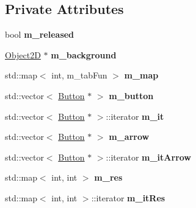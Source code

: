 \subsection*{Private Attributes}
\begin{DoxyCompactItemize}
\item 
\hypertarget{class_option_state_a297c72dde7082d4674447e9ba4ef3902}{}bool {\bfseries m\+\_\+released}\label{class_option_state_a297c72dde7082d4674447e9ba4ef3902}

\item 
\hypertarget{class_option_state_a405e39bcf1789208f5325585135b0558}{}\hyperlink{class_object2_d}{Object2\+D} $\ast$ {\bfseries m\+\_\+background}\label{class_option_state_a405e39bcf1789208f5325585135b0558}

\item 
\hypertarget{class_option_state_ac50d70dca5a11eea55010a229b9dc0e0}{}std\+::map$<$ int, m\+\_\+tab\+Fun $>$ {\bfseries m\+\_\+map}\label{class_option_state_ac50d70dca5a11eea55010a229b9dc0e0}

\item 
\hypertarget{class_option_state_ae8cbbd5a41b2501ce5e937498e188579}{}std\+::vector$<$ \hyperlink{class_button}{Button} $\ast$ $>$ {\bfseries m\+\_\+button}\label{class_option_state_ae8cbbd5a41b2501ce5e937498e188579}

\item 
\hypertarget{class_option_state_a4a92d30e579f3fbdcfde1d1f2a184c38}{}std\+::vector$<$ \hyperlink{class_button}{Button} $\ast$ $>$\+::iterator {\bfseries m\+\_\+it}\label{class_option_state_a4a92d30e579f3fbdcfde1d1f2a184c38}

\item 
\hypertarget{class_option_state_ad7347fc39629c286d7183595c813fc18}{}std\+::vector$<$ \hyperlink{class_button}{Button} $\ast$ $>$ {\bfseries m\+\_\+arrow}\label{class_option_state_ad7347fc39629c286d7183595c813fc18}

\item 
\hypertarget{class_option_state_a1d7531d63faa28a1dec1b3f2d3146150}{}std\+::vector$<$ \hyperlink{class_button}{Button} $\ast$ $>$\+::iterator {\bfseries m\+\_\+it\+Arrow}\label{class_option_state_a1d7531d63faa28a1dec1b3f2d3146150}

\item 
\hypertarget{class_option_state_aa12f58ecf19a678c6933898143124d04}{}std\+::map$<$ int, int $>$ {\bfseries m\+\_\+res}\label{class_option_state_aa12f58ecf19a678c6933898143124d04}

\item 
\hypertarget{class_option_state_a71894827b23fd768300aacae344f7234}{}std\+::map$<$ int, int $>$\+::iterator {\bfseries m\+\_\+it\+Res}\label{class_option_state_a71894827b23fd768300aacae344f7234}

\end{DoxyCompactItemize}
